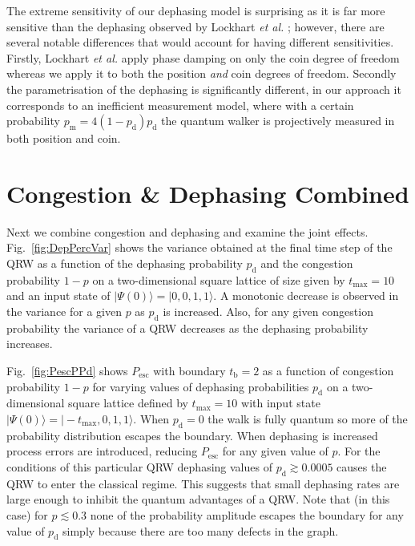 \documentclass[aps,pra,twocolumn,amsmath,amssymb,nofootinbib,superscriptaddress]{revtex4}
\newcommand{\ket}[1]{|#1\rangle}
\begin{document}
The extreme sensitivity of our dephasing model is surprising as it is far more sensitive than the dephasing observed by Lockhart \emph{et al.} \cite{bib:lockhart2013performance}; however, there are several notable differences that would account for having different sensitivities. Firstly, Lockhart \emph{et al.} apply phase damping on only the coin degree of freedom whereas we apply it to both the position \emph{and} coin degrees of freedom. Secondly the parametrisation of the dephasing is significantly different, in our approach it corresponds to an inefficient measurement model, where with a certain probability $p_{\mathrm{m}}=4(1-p_{\mathrm{d}})p_{\mathrm{d}}$ the quantum walker is projectively measured in both position and coin. 

\section{Congestion \& Dephasing Combined}
Next we combine congestion and dephasing and examine the joint effects. Fig.~\ref{fig:DepPercVar} shows the variance obtained at the final time step of the QRW as a function of the dephasing probability $p_{\mathrm{d}}$ and the congestion probability $1-p$ on a two-dimensional square lattice of size given by $t_\mathrm{max}=10$ and an input state of $\ket{\Psi(0)}=\ket{0,0,1,1}$. A monotonic decrease is observed in the variance for a given $p$ as $p_{\mathrm{d}}$ is increased. Also, for any given congestion probability the variance of a QRW decreases as the dephasing probability increases. 


Fig.~\ref{fig:PescPPd} shows $P_\mathrm{esc}$ with boundary $t_\mathrm{b}=2$ as a function of congestion probability $1-p$ for varying values of dephasing probabilities $p_{\mathrm{d}}$ on a two-dimensional square lattice defined by $t_\mathrm{max}=10$ with input state $\ket{\Psi(0)}=\ket{-t_\mathrm{max},0,1,1}$. When $p_{\mathrm{d}}=0$ the walk is fully quantum so more of the probability distribution escapes the boundary. When dephasing is increased process errors are introduced, reducing $P_{\mathrm{esc}}$ for any given value of $p$. For the conditions of this particular QRW dephasing values of $p_{\mathrm{d}}\gtrsim 0.0005$ causes the QRW to enter the classical regime. This suggests that small dephasing rates are large enough to inhibit the quantum advantages of a QRW. Note that (in this case) for $p\lesssim0.3$ none of the probability amplitude escapes the boundary for any value of $p_{\mathrm{d}}$ simply because there are too many defects in the graph.
\end{document}
